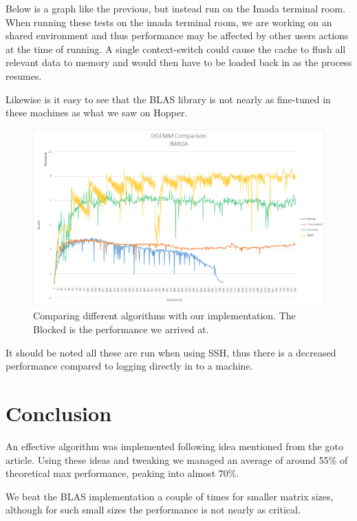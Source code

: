 \documentclass[a4paper,11pt,oneside]{book}
\begin{document}
Below is a graph like the previous, but instead run on the Imada terminal room. When running these tests on the imada terminal room, we are working on an shared environment and thus performance may be affected by other users actions at the time of running. A single context-switch could cause the cache to flush all relevant data to memory and would then have to be loaded back in as the process resumes.

Likewise is it easy to see that the BLAS library is not nearly as fine-tuned in these machines as what we saw on Hopper.

\begin{figure}[H]
  \centering
  \includegraphics[width=0.9\linewidth]{comparison-graph-imada.png}
  \caption{Comparing different algorithms with our implementation. The Blocked is the performance we arrived at.}
  \centering
  \label{fig:sub1}
\end{figure}

It should be noted all these are run when using SSH, thus there is a decreased performance compared to logging directly in to a machine. %

\chapter{Conclusion}
An effective algorithm was implemented following idea mentioned from the goto article. Using these ideas and tweaking we managed an average of around 55\% of theoretical max performance, peaking into almost 70\%. 

We beat the BLAS implementation a couple of times for smaller matrix sizes, although for such small sizes the performance is not nearly as critical.


\end{document}

